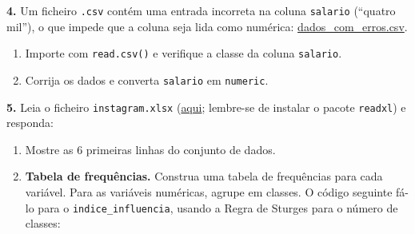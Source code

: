 \documentclass[
  portuguese,
  11pt,
  openany]{book}
\begin{document}
\textbf{4.} Um ficheiro \texttt{.csv} contém uma entrada incorreta na coluna \texttt{salario}
(``quatro mil''), o que impede que a coluna seja lida como numérica:
\href{docs/dados_com_erros.csv}{dados\_com\_erros.csv}.

\begin{enumerate}
\def\labelenumi{(\alph{enumi})}
\item
  Importe com \texttt{read.csv()} e verifique a classe da coluna \texttt{salario}.
\item
  Corrija os dados e converta \texttt{salario} em \texttt{numeric}.
\end{enumerate}

\textbf{5.} Leia o ficheiro \texttt{instagram.xlsx}
(\href{https://renatorpaula.wixsite.com/renato/laboratorio-estatistica}{aqui}; lembre-se
de instalar o pacote \texttt{readxl}) e responda:

\begin{enumerate}
\def\labelenumi{(\alph{enumi})}
\item
  Mostre as 6 primeiras linhas do conjunto de dados.
\item
  \textbf{Tabela de frequências.} Construa uma tabela de frequências para cada variável.
  Para as variáveis numéricas, agrupe em classes. O código seguinte fá-lo para o
  \texttt{indice\_influencia}, usando a Regra de Sturges para o número de classes:
\end{enumerate}
\end{document}
